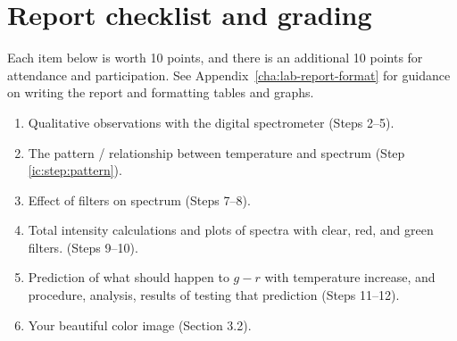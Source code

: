 \section{Report checklist and grading}

Each item below is worth 10 points, and there is an additional 10 points for attendance and participation. See Appendix\ \ref{cha:lab-report-format} for guidance on writing the report and formatting tables and graphs.

\begin{enumerate}
	\item Qualitative observations with the digital spectrometer (Steps 2--5).
	\item The pattern / relationship between temperature and spectrum (Step \ref{ic:step:pattern}).
	\item Effect of filters on spectrum (Steps 7--8).
	\item Total intensity calculations and plots of spectra with clear, red, and green filters. (Steps 9--10).
	\item Prediction of what should happen to $g-r$ with temperature increase, and procedure, analysis, results of testing that prediction (Steps 11--12).
	\item Your beautiful color image (Section 3.2).
\end{enumerate}
